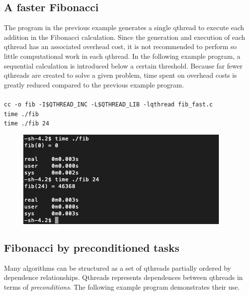 \documentclass[12pt,fullpage]{article}
\begin{document}
\subsection{A faster Fibonacci}
The program in the previous example generates a single qthread to execute each addition in the Fibonacci calculation.  Since the generation and execution of each qthread has an associated overhead cost, it is not recommended to perform so little computational work in each qthread.  In the following example program, a sequential calculation is introduced below a certain threshold. Because far fewer qthreads are created to solve a given problem, time spent on overhead costs is greatly reduced compared to the previous example program.
\\  \\
{\footnotesize{\tt cc -o fib -I\$QTHREAD\_INC -L\$QTHREAD\_LIB -lqthread fib\_fast.c}}
\\
{\footnotesize{\tt time ./fib}}
\\
{\footnotesize{\tt time ./fib 24}}
\newpage


\begin{figure}
\includegraphics{images/fib_fast.png}
\end{figure}

\subsection{Fibonacci by preconditioned tasks}

Many algorithms can be structured as a set of qthreads partially ordered by dependence relationships.  Qthreads represents dependences between qthreads in terms of {\it preconditions}.  The following example program demonstrates their use.
\\

\end{document}
